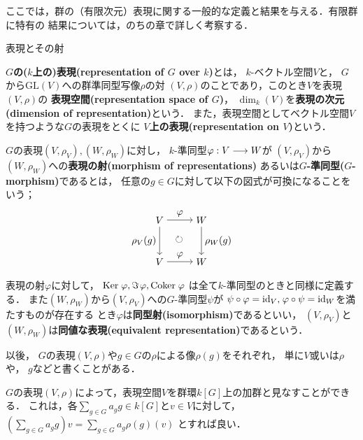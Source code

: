 \documentclass[a4paper,thmnumbering=section,eqnumbering=section]{summary-ja}
\newcommand{\gl}{\textrm{GL}}
\newcommand{\hs}{\hspace{1pt}}
\begin{document}
ここでは，群の（有限次元）表現に関する一般的な定義と結果を与える．有限群に特有の
結果については，のちの章で詳しく考察する．
\begin{definition}{表現とその射}{}\par
    \quad \textbf{$G$の($k$上の)表現(representation of $G$ over $k$)}とは，
    $k$-ベクトル空間$V$と， $G$から$\gl(V)$への群準同型写像$\rho$の対
    $(V,\rho)$のことであり，このとき$V$を表現$(V,\rho)$の
    \textbf{表現空間(representation space of $G$)}，
    $\dim_k(V)$を\textbf{表現の次元(dimension of representation)}という．
    また，表現空間としてベクトル空間$V$を持つような$G$の表現をとくに
    \textbf{$V$上の表現(representation on $V$)}という．\par
    \quad $G$の表現$(V,\rho_V),(W, \rho_W)$に対し， $k$-準同型$\varphi:V\longrightarrow W$が
    $(V,\rho_V)$から$(W, \rho_W)$への\textbf{表現の射(morphism of representations)}
    あるいは\textbf{$G$-準同型($G$-morphism)}であるとは，
    任意の$g\in G$に対して以下の図式が可換になることをいう；
    \begin{align}
        \begin{tikzpicture}
            \node (Vup) at (0,0) {$V$};
            \node (Wup) at (1.5,0) {$W$};
            \node (Vdown) at (0,-1.5) {$V$};
            \node (Wdown) at (1.5,-1.5) {$W$};
            \draw[->] (Vup) -- node[above] {$\varphi$}  (Wup); 
            \draw[->] (Vup) -- node[left] {$\rho_V(g)$} (Vdown);
            \draw[->] (Wup) -- node[right] {$\rho_W(g)$} (Wdown);
            \draw[->] (Vdown) -- node[above] {$\varphi$} (Wdown);
            \node at (0.7,-0.7) {$\circlearrowright $};
        \end{tikzpicture}
    \end{align}
    \quad 表現の射$\varphi$に対して， $\Ker\hs\varphi, \Im\hs\varphi, \Coker\hs\varphi$
    は全て$k$-準同型のときと同様に定義する．
    また$(W, \rho_W)$から$(V,\rho_V)$への$G$-準同型$\psi$が
    $\psi\circ\varphi=\id_{V},\hs \varphi\circ\psi=\id_{W}$を満たすものが存在する
    とき$\varphi$は\textbf{同型射(isomorphism)}であるといい，
    $(V,\rho_V)$と$(W, \rho_W)$は\textbf{同値な表現(equivalent representation)}であるという．\par
    \quad 以後， $G$の表現$(V,\rho)$や$g\in G$の$\rho$による像$\rho(g)$をそれぞれ，
    単に$V$或いは$\rho$や， $g$などと書くことがある．
\end{definition}

\begin{remark}
    $G$の表現$(V,\rho)$によって，表現空間$V$を群環$k[G]$上の加群と見なすことができる．
    これは，各$\sum_{g\in G} a_gg\in k[G]$と$v\in V$に対して，
    $(\sum_{g\in G} a_gg) v = \sum_{g\in G} a_g\rho(g)(v)$
    とすれば良い．
\end{remark}
\end{document}
